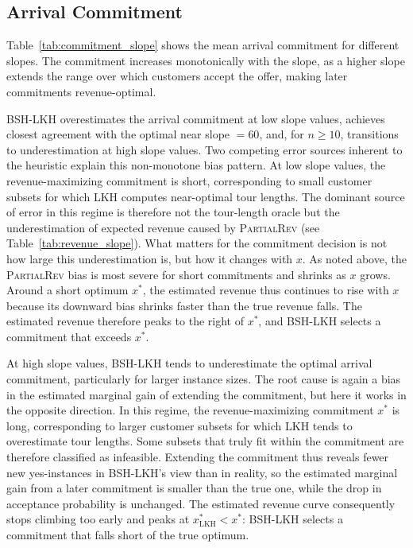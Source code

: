 \documentclass[11pt]{article}
\theoremstyle{plain}
\theoremstyle{definition}
\begin{document}
\subsection{Arrival Commitment}
Table~\ref{tab:commitment_slope} shows the mean arrival commitment for different slopes. 
The commitment increases monotonically with the slope, as a higher slope
extends the range over which customers accept the offer, making later commitments
revenue-optimal.

BSH-\ac{LKH} overestimates the arrival commitment at low slope values, achieves closest agreement 
with the optimal near slope $= 60$, and, for $n \geq 10$, transitions to underestimation at high slope values. 
Two competing error sources inherent to the heuristic explain this non-monotone bias
pattern. At low slope values, the revenue-maximizing commitment is short, corresponding to
small customer subsets for which \ac{LKH} computes near-optimal tour lengths. The dominant
source of error in this regime is therefore not the tour-length oracle but the
underestimation of expected revenue caused by \textsc{PartialRev}
(see Table~\ref{tab:revenue_slope}). What matters for the commitment decision is not
how large this underestimation is, but how it changes with $x$. As noted above, the \textsc{PartialRev} bias is most severe for short commitments and
shrinks as $x$ grows. Around a short optimum $x^*$, the estimated revenue thus continues
to rise with $x$ because its downward bias shrinks faster than the true revenue falls.
The estimated revenue therefore peaks to the right of $x^*$, and BSH-\ac{LKH} selects a
commitment that exceeds $x^*$. 

At high slope values, BSH-\ac{LKH} tends to underestimate the optimal arrival commitment,
particularly for larger instance sizes. The
root cause is again a bias in the estimated marginal gain of extending the commitment, but
here it works in the opposite direction. In this regime, the revenue-maximizing commitment
$x^*$ is long, corresponding to larger customer subsets for which \ac{LKH} tends to
overestimate tour lengths. Some subsets that truly fit within the commitment are therefore 
classified as infeasible. Extending the commitment thus reveals fewer new yes-instances in
BSH-\ac{LKH}'s view than in reality, so the estimated marginal gain from a later commitment
is smaller than the true one, while the drop in acceptance probability is unchanged. 
The estimated revenue curve consequently stops climbing too early and peaks
at $x^*_\text{LKH} < x^*$: BSH-\ac{LKH} selects a commitment that falls short of the
true optimum.
\end{document}

